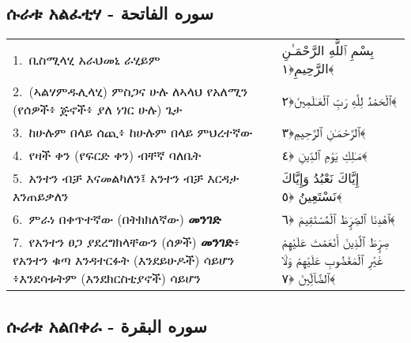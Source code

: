 \documentclass[11pt,a4paper,oneside]{article}%
\newcommand{\mytextarabic}[1]{\textarabic{ #1 \flushright}}
\begin{document}
\tableofcontents{}
\cleardoublepage
{}
\begin{center}\section{ሱራቱ አልፈቲሃ -  \textarabic{سوره  الفاتحة}}\end{center}
\begin{longtable}{%
  @{}
    p{}
  @{~~~}
    p{}
    @{}
}
1.\ ቢስሚላሂ አራህመኒ ራሂይም &  \mytextarabic{بِسْمِ ٱللَّهِ الرَّحْمَـٰنِ الرَّحِيمِ﴿١﴾}     \\
2.\ (ኣልሃምዱሊላሂ) ምስጋና ሁሉ ለኣላህ የአለሚን (የሰዎች፥ ጅኖች፥ ያለ ነገር ሁሉ) ጌታ & \mytextarabic{ٱلْحَمْدُ لِلَّهِ رَبِّ ٱلْعَـٰلَمِينَ﴿٢﴾} \\
3.\ ከሁሉም በላይ ሰጪ፥ ከሁሉም በላይ ምህረተኛው & \mytextarabic{ٱلرَّحْمَـٰنِ ٱلرَّحِيمِ﴿٣﴾}   \\
4.\ የዛች ቀን (የፍርድ ቀን) ብቸኛ ባለቤት &  \mytextarabic{ مَـٰلِكِ يَوْمِ ٱلدِّينِ ﴿٤﴾}   \\
5.\ አንተን ብቻ እናመልካለን፤ አንተን ብቻ እርዳታ እንጠይቃለን &  \mytextarabic{إِيَّاكَ نَعْبُدُ وَإِيَّاكَ نَسْتَعِينُ ﴿٥﴾}   \\
6.\ ምራነ በቀጥተኛው (በትክክለኛው) {\bf መንገድ} &  \mytextarabic{ٱهْدِنَا ٱلصِّرَٟطَ ٱلْمُسْتَقِيمَ ﴿٦﴾}  \\
7.\ የአንተን ፀጋ ያደረግክላቸውን (ሰዎች) {\bf መንገድ}፥ የአንተን ቁጣ እንዳተርፉት (እንደይሁዶች) ሳይሆን ፥እንደሳቱትም (እንደክርስቲያኖች) ሳይሆን &  \mytextarabic{ صِرَٟطَ ٱلَّذِينَ أَنْعَمْتَ عَلَيْهِمْ غَيْرِ ٱلْمَغْضُوبِ عَلَيْهِمْ وَلَا ٱلضَّآلِّينَ ﴿٧﴾} 

\end{longtable}
\clearpage
\begin{center}\section{ሱራቱ አልበቀራ -  \textarabic{سوره  البقرة} }\end{center}
\end{document}
